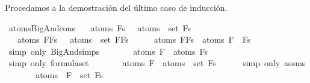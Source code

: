 \begin{isabellebody}
\begin{isamarkuptext}
  Procedamos a la demostración del último caso de inducción.%
\end{isamarkuptext}\isamarkuptrue%
\isamarkupfalse%
\ atoms{\isacharunderscore}BigAnd{\isacharunderscore}cons{\isacharcolon}\isanewline
\ \ \ {\isachardoublequoteopen}atoms\ {\isacharparenleft}\isactrlbold {\isasymAnd}Fs{\isacharparenright}\ {\isacharequal}\ {\isasymUnion}\ {\isacharparenleft}atoms\ {\isacharbackquote}\ set\ Fs{\isacharparenright}{\isachardoublequoteclose}\isanewline
\ \ \ {\isachardoublequoteopen}atoms\ {\isacharparenleft}\isactrlbold {\isasymAnd}{\isacharparenleft}F{\isacharhash}Fs{\isacharparenright}{\isacharparenright}\ {\isacharequal}\ {\isasymUnion}\ {\isacharparenleft}atoms\ {\isacharbackquote}\ set\ {\isacharparenleft}F{\isacharhash}Fs{\isacharparenright}{\isacharparenright}{\isachardoublequoteclose}\isanewline
%
\isadelimproof
%
\endisadelimproof
%
\isatagproof
{}\isamarkupfalse%
\ {\isacharminus}\isanewline
\ \ \isamarkupfalse%
\ {\isachardoublequoteopen}atoms\ {\isacharparenleft}\isactrlbold {\isasymAnd}{\isacharparenleft}F{\isacharhash}Fs{\isacharparenright}{\isacharparenright}\ {\isacharequal}\ atoms\ {\isacharparenleft}F\ \isactrlbold {\isasymand}\ \isactrlbold {\isasymAnd}Fs{\isacharparenright}{\isachardoublequoteclose}\isanewline
\ \ \ \ \isamarkupfalse%
\ {\isacharparenleft}simp\ only{\isacharcolon}\ BigAnd{\isachardot}simps{\isacharparenleft}{}{\isacharparenright}{\isacharparenright}\isanewline
\ \ \isamarkupfalse%
\ \isamarkupfalse%
\ {\isachardoublequoteopen}{\isasymdots}\ {\isacharequal}\ atoms\ F\ {\isasymunion}\ atoms\ {\isacharparenleft}\isactrlbold {\isasymAnd}Fs{\isacharparenright}{\isachardoublequoteclose}\isanewline
\ \ \ \ \isamarkupfalse%
\ {\isacharparenleft}simp\ only{\isacharcolon}\ formula{\isachardot}set{\isacharparenleft}{}{\isacharparenright}{\isacharparenright}\isanewline
\ \ \isamarkupfalse%
\ \isamarkupfalse%
\ {\isachardoublequoteopen}{\isasymdots}\ {\isacharequal}\ atoms\ F\ {\isasymunion}\ {\isasymUnion}{\isacharparenleft}atoms\ {\isacharbackquote}\ set\ Fs{\isacharparenright}{\isachardoublequoteclose}\isanewline
\ \ \ \ \isamarkupfalse%
\ {\isacharparenleft}simp\ only{\isacharcolon}\ assms{\isacharparenright}\isanewline
\ \ \isamarkupfalse%
\ \isamarkupfalse%
\ {\isachardoublequoteopen}{\isasymdots}\ {\isacharequal}\ {\isasymUnion}{\isacharparenleft}atoms\ {\isacharbackquote}\ {\isacharparenleft}{\isacharbraceleft}F{\isacharbraceright}\ {\isasymunion}\ set\ Fs{\isacharparenright}{\isacharparenright}{\isachardoublequoteclose}\ \isanewline

\end{isabellebody}
